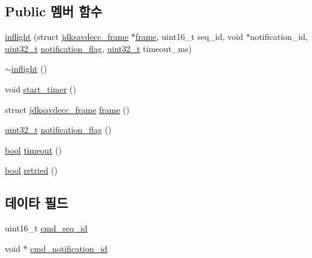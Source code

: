 \subsection*{Public 멤버 함수}
\begin{DoxyCompactItemize}
\item 
\hyperlink{classavdecc__lib_1_1inflight_af48ab71e2ccdcd0b2a790c74dd65afcc}{inflight} (struct \hyperlink{structjdksavdecc__frame}{jdksavdecc\+\_\+frame} $\ast$\hyperlink{classavdecc__lib_1_1inflight_a036cb8d3d1c24cd0f34f101b44a8cb92}{frame}, uint16\+\_\+t seq\+\_\+id, void $\ast$notification\+\_\+id, \hyperlink{parse_8c_a6eb1e68cc391dd753bc8ce896dbb8315}{uint32\+\_\+t} \hyperlink{classavdecc__lib_1_1inflight_a6d92b4faaea5e92909388eade16c7dcd}{notification\+\_\+flag}, \hyperlink{parse_8c_a6eb1e68cc391dd753bc8ce896dbb8315}{uint32\+\_\+t} timeout\+\_\+ms)
\item 
\hyperlink{classavdecc__lib_1_1inflight_ab74602966c1bdf0d8ad1d51a8c46e5b4}{$\sim$inflight} ()
\item 
void \hyperlink{classavdecc__lib_1_1inflight_aaedac22c55880495505bf375e0e132c1}{start\+\_\+timer} ()
\item 
struct \hyperlink{structjdksavdecc__frame}{jdksavdecc\+\_\+frame} \hyperlink{classavdecc__lib_1_1inflight_a036cb8d3d1c24cd0f34f101b44a8cb92}{frame} ()
\item 
\hyperlink{parse_8c_a6eb1e68cc391dd753bc8ce896dbb8315}{uint32\+\_\+t} \hyperlink{classavdecc__lib_1_1inflight_a6d92b4faaea5e92909388eade16c7dcd}{notification\+\_\+flag} ()
\item 
\hyperlink{avb__gptp_8h_af6a258d8f3ee5206d682d799316314b1}{bool} \hyperlink{classavdecc__lib_1_1inflight_aa8795f32f3da0bbd7b3fcefe73818239}{timeout} ()
\item 
\hyperlink{avb__gptp_8h_af6a258d8f3ee5206d682d799316314b1}{bool} \hyperlink{classavdecc__lib_1_1inflight_a9a6009c8e4e2c27b952e893a742e8cca}{retried} ()
\end{DoxyCompactItemize}
\subsection*{데이타 필드}
\begin{DoxyCompactItemize}
\item 
uint16\+\_\+t \hyperlink{classavdecc__lib_1_1inflight_a8bdf72b053c3df68d591e3e067bd43ab}{cmd\+\_\+seq\+\_\+id}
\item 
void $\ast$ \hyperlink{classavdecc__lib_1_1inflight_ae12ae96f6a6a0968d009df862ac491ab}{cmd\+\_\+notification\+\_\+id}
\end{DoxyCompactItemize}
